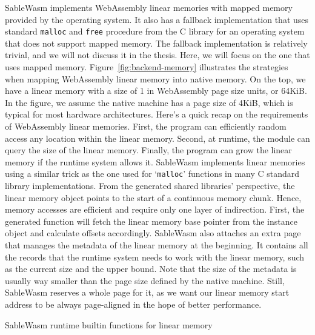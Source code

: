 SableWasm implements WebAssembly linear memories with mapped memory provided
by the operating system. It also has a fallback implementation that uses
standard \texttt{malloc} and \texttt{free} procedure from the C library for an
operating system that does not support mapped memory. The fallback
implementation is relatively trivial, and we will not discuss it in the thesis.
Here, we will focus on the one that uses mapped memory.
Figure~\ref{fig:backend-memory} illustrates the strategies when mapping
WebAssembly linear memory into native memory. On the top, we have a linear
memory with a size of 1 in WebAssembly page size units, or 64KiB. In the figure,
we assume the native machine has a page size of 4KiB, which is typical for most
hardware architectures. Here's a quick recap on the requirements of WebAssembly
linear memories. First, the program can efficiently random access any location
within the linear memory. Second, at runtime, the module can query
the size of the linear memory. Finally, the program can grow the linear memory
if the runtime system allows it. SableWasm implements linear memories using
a similar trick as the one used for `\texttt{malloc}' functions in many C
standard library implementations. From the generated shared libraries'
perspective, the linear memory object points to the start of a continuous
memory chunk. Hence, memory accesses are efficient and require only one layer
of indirection. First, the generated function will fetch the linear memory base
pointer from the instance object and calculate offsets accordingly.
SableWasm also attaches an extra page that manages the metadata of the linear
memory at the beginning. It contains all the records that the runtime system
needs to work with the linear memory, such as the current size and the upper
bound. Note that the size of the metadata is usually way smaller than the page
size defined by the native machine. Still, SableWasm reserves a whole page for
it, as we want our linear memory start address to be always page-aligned in the
hope of better performance.

\begin{table}[h]
    \centering
    
    \caption{SableWasm runtime builtin functions for linear memory}
    \label{tbl:sablewasm-runtime-memory-api}
\end{table}

